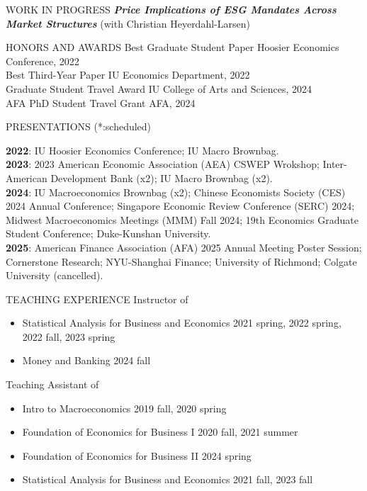 \documentclass{resume} %
\begin{document}
\newpage
\begin{rSection}{WORK IN PROGRESS}
\textbf{\textit{Price Implications of ESG Mandates Across Market Structures}} (with Christian Heyerdahl-Larsen)
\end{rSection}



\begin{rSection}{HONORS AND AWARDS}
Best Graduate Student Paper  \hfill{Hoosier Economics Conference, 2022} \\
Best Third-Year Paper \hfill{IU Economics Department, 2022} \\
Graduate Student Travel Award \hfill{IU College of Arts and Sciences, 2024} \\
AFA PhD Student Travel Grant \hfill{AFA, 2024} 
\end{rSection} 


\begin{rSection}{PRESENTATIONS}
 (*:scheduled) 

\textbf{2022}: IU Hoosier Economics Conference; IU Macro Brownbag. \\
\textbf{2023}: 2023 American Economic Association (AEA) CSWEP Wrokshop; Inter-American Development Bank (x2); IU Macro Brownbag (x2). \\
\textbf{2024}: IU Macroeconomics Brownbag (x2); Chinese Economists Society (CES) 2024 Annual Conference; Singapore Economic Review Conference (SERC) 2024; Midwest Macroeconomics Meetings (MMM) Fall 2024; 19th Economics Graduate Student Conference; Duke-Kunshan University. \\
\textbf{2025}: American Finance Association (AFA) 2025 Annual Meeting Poster Session; Cornerstone Research; NYU-Shanghai Finance; University of Richmond; Colgate University (cancelled).
\end{rSection} 



\begin{rSection}{TEACHING EXPERIENCE}
Instructor of 
\begin{itemize}
\addtolength\itemsep{-2mm}
    \item[]  Statistical Analysis for Business and Economics \hfill{2021 spring, 2022 spring, 2022 fall, 2023 spring}
    \item[] Money and Banking \hfill{2024 fall}
\end{itemize}  
Teaching Assistant of 
\begin{itemize}
\addtolength\itemsep{-2mm}
    \item[] Intro to Macroeconomics \hfill{2019 fall, 2020 spring}
    \item[] Foundation of Economics for Business I \hfill{2020 fall, 2021 summer}
    \item[] Foundation of Economics for Business II \hfill{2024 spring}
    \item[] Statistical Analysis for Business and Economics \hfill{2021 fall, 2023 fall} 
\end{itemize}
\end{rSection} 
\end{document}
